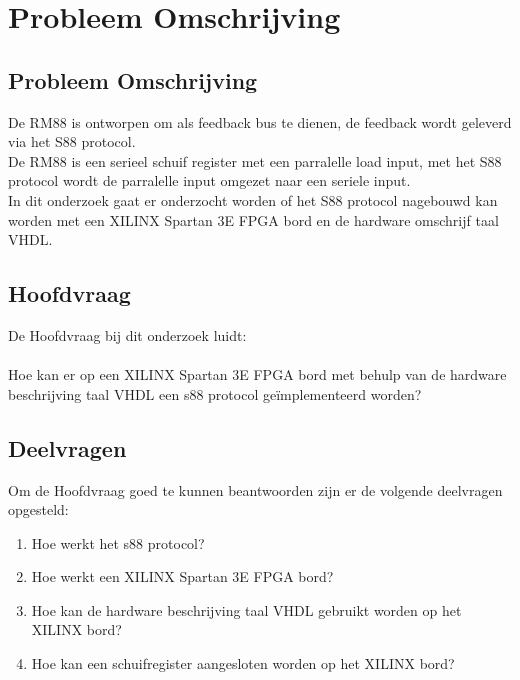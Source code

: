 \chapter{Probleem Omschrijving}
\section{Probleem Omschrijving}

De RM88 is ontworpen om als feedback bus te dienen, de feedback wordt geleverd via het S88 protocol.\\
De RM88 is een serieel schuif register met een parralelle load input, met het S88 protocol wordt de parralelle input omgezet naar een seriele input.\\
In dit onderzoek gaat er onderzocht worden of het S88 protocol nagebouwd kan worden met een XILINX Spartan 3E FPGA bord en de hardware omschrijf taal VHDL.


\section{Hoofdvraag}
De Hoofdvraag bij dit onderzoek luidt:
\\\\
Hoe kan er op een XILINX Spartan 3E FPGA bord met behulp van de hardware beschrijving taal VHDL een s88 protocol geïmplementeerd worden?
\\

\section{Deelvragen}
Om de Hoofdvraag goed te kunnen beantwoorden zijn er de volgende deelvragen opgesteld:

\begin{enumerate}
	\item Hoe werkt het s88 protocol?
	\item Hoe werkt een XILINX Spartan 3E FPGA bord?
	\item Hoe kan de hardware beschrijving taal VHDL gebruikt worden op het XILINX bord?
	\item Hoe kan een schuifregister aangesloten worden op het XILINX bord?
\end{enumerate}